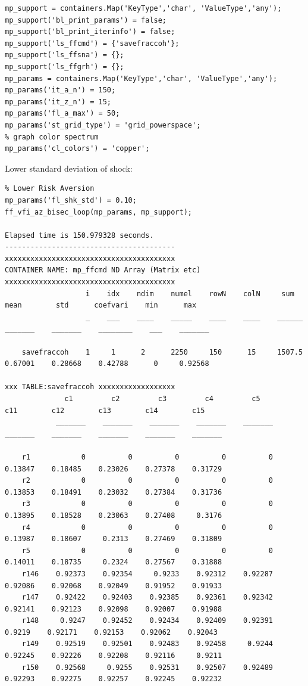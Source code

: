 \documentclass[
]{book}
\begin{document}
\begin{verbatim}
mp_support = containers.Map('KeyType','char', 'ValueType','any');
mp_support('bl_print_params') = false;
mp_support('bl_print_iterinfo') = false;
mp_support('ls_ffcmd') = {'savefraccoh'};
mp_support('ls_ffsna') = {};
mp_support('ls_ffgrh') = {};
mp_params = containers.Map('KeyType','char', 'ValueType','any');
mp_params('it_a_n') = 150;
mp_params('it_z_n') = 15;
mp_params('fl_a_max') = 50;
mp_params('st_grid_type') = 'grid_powerspace';
% graph color spectrum
mp_params('cl_colors') = 'copper';
\end{verbatim}

Lower standard deviation of shock:

\begin{verbatim}
% Lower Risk Aversion
mp_params('fl_shk_std') = 0.10;
ff_vfi_az_bisec_loop(mp_params, mp_support);

Elapsed time is 150.979328 seconds.
----------------------------------------
xxxxxxxxxxxxxxxxxxxxxxxxxxxxxxxxxxxxxxxx
CONTAINER NAME: mp_ffcmd ND Array (Matrix etc)
xxxxxxxxxxxxxxxxxxxxxxxxxxxxxxxxxxxxxxxx
                   i    idx    ndim    numel    rowN    colN     sum       mean        std      coefvari    min      max  
                   _    ___    ____    _____    ____    ____    ______    _______    _______    ________    ___    _______

    savefraccoh    1     1      2      2250     150      15     1507.5    0.67001    0.28668    0.42788      0     0.92568

xxx TABLE:savefraccoh xxxxxxxxxxxxxxxxxx
              c1         c2         c3         c4         c5         c11        c12        c13        c14        c15  
            _______    _______    _______    _______    _______    _______    _______    _______    _______    _______

    r1            0          0          0          0          0    0.13847    0.18485    0.23026    0.27378    0.31729
    r2            0          0          0          0          0    0.13853    0.18491    0.23032    0.27384    0.31736
    r3            0          0          0          0          0    0.13895    0.18528    0.23063    0.27408     0.3176
    r4            0          0          0          0          0    0.13987    0.18607     0.2313    0.27469    0.31809
    r5            0          0          0          0          0    0.14011    0.18735     0.2324    0.27567    0.31888
    r146    0.92373    0.92354     0.9233    0.92312    0.92287    0.92086    0.92068    0.92049    0.91952    0.91933
    r147    0.92422    0.92403    0.92385    0.92361    0.92342    0.92141    0.92123    0.92098    0.92007    0.91988
    r148     0.9247    0.92452    0.92434    0.92409    0.92391     0.9219    0.92171    0.92153    0.92062    0.92043
    r149    0.92519    0.92501    0.92483    0.92458     0.9244    0.92245    0.92226    0.92208    0.92116     0.9211
    r150    0.92568     0.9255    0.92531    0.92507    0.92489    0.92293    0.92275    0.92257    0.92245    0.92232
\end{verbatim}
\end{document}
